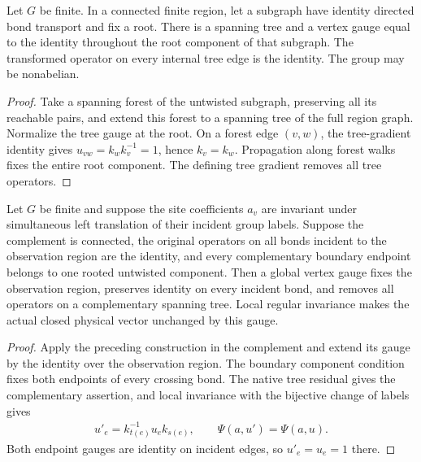 \begin{lemma}
    \label{lem:peps_anchored_tree_gauge}
    \leanok
    Let $G$ be finite. In a connected finite region, let a subgraph have identity directed
    bond transport and fix a root. There is a spanning tree and a vertex
    gauge equal to the identity throughout the root component of that
    subgraph. The transformed operator on every internal tree edge is
    the identity. The group may be nonabelian.
\end{lemma}
\begin{proof}\leanok
    Take a spanning forest of the untwisted subgraph, preserving all its
    reachable pairs, and extend this forest to a spanning tree of the
    full region graph. Normalize the tree gauge at the root. On a forest
    edge $(v,w)$, the tree-gradient identity gives
    $u_{vw}=k_wk_v^{-1}=1$, hence $k_v=k_w$. Propagation along forest walks fixes the entire
    root component. The defining tree gradient removes all tree operators.
\end{proof}

\begin{lemma}
    \label{lem:peps_anchored_complement_gauge}
    \leanok
    Let $G$ be finite and suppose the site coefficients $a_v$ are invariant
    under simultaneous left translation of their incident group labels.
    Suppose the complement is connected, the original operators on all
    bonds incident to the observation region are the identity, and every
    complementary boundary endpoint belongs to one rooted untwisted
    component. Then a global vertex gauge fixes the observation region,
    preserves identity on every incident bond, and removes all operators
    on a complementary spanning tree. Local regular invariance makes
    the actual closed physical vector unchanged by this gauge.
\end{lemma}
\begin{proof}\leanok
    Apply the preceding construction in the complement and extend its
    gauge by the identity over the observation region. The boundary
    component condition fixes both endpoints of every crossing bond.
    The native tree residual gives the complementary assertion, and
    local invariance with the bijective change of labels gives
    \begin{align}
        u'_e=k_{t(e)}^{-1}u_ek_{s(e)},\qquad
        \Psi(a,u')=\Psi(a,u).
        \label{eq:peps_anchored_complement_closed_gauge}
    \end{align}
    Both endpoint gauges are identity on incident edges, so $u'_e=u_e=1$ there.
\end{proof}
